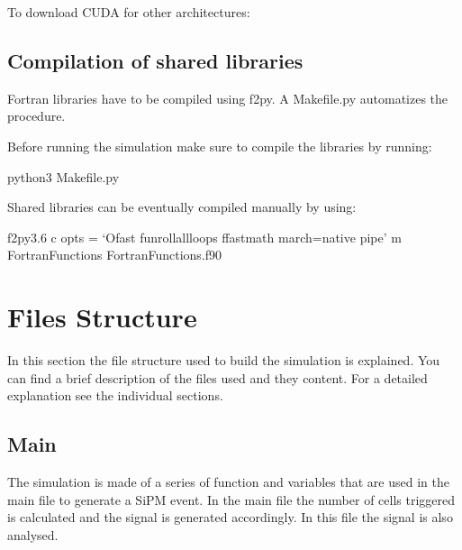 \documentclass[letterpaper,10pt,english]{sphinxmanual}
\begin{document}
To download CUDA for other architectures: 


\section{Compilation of shared libraries}
\label{\detokenize{installation:compilation-of-shared-libraries}}
\begin{DUlineblock}{0em}
\item[] Fortran libraries have to be compiled using f2py. A Makefile.py automatizes the procedure.
\item[] Before running the simulation make sure to compile the libraries by running:
\end{DUlineblock}

\begin{sphinxVerbatim}[commandchars=\\\{\}]
python3 Makefile.py
\end{sphinxVerbatim}

Shared libraries can be eventually compiled manually by using:

\begin{sphinxVerbatim}[commandchars=\\\{\}]

\end{sphinxVerbatim}

f2py3.6 \sphinxhyphen{}c \textendash{}opts = ‘\sphinxhyphen{}Ofast \sphinxhyphen{}funroll\sphinxhyphen{}all\sphinxhyphen{}loops \sphinxhyphen{}ffast\sphinxhyphen{}math \sphinxhyphen{}march=native \sphinxhyphen{}pipe’ \sphinxhyphen{}m FortranFunctions FortranFunctions.f90


\chapter{Files Structure}
\label{\detokenize{structure:files-structure}}\label{\detokenize{structure::doc}}
In this section the file structure used to build the simulation is explained. You can find a brief description of the files used and they content. For a detailed explanation see the individual sections.


\section{Main}
\label{\detokenize{structure:main}}
The simulation is made of a series of function and variables that are used in the main file to generate a SiPM event. In the main file the number of cells triggered is calculated and the signal is generated accordingly. In this file the signal is also analysed.
\end{document}
